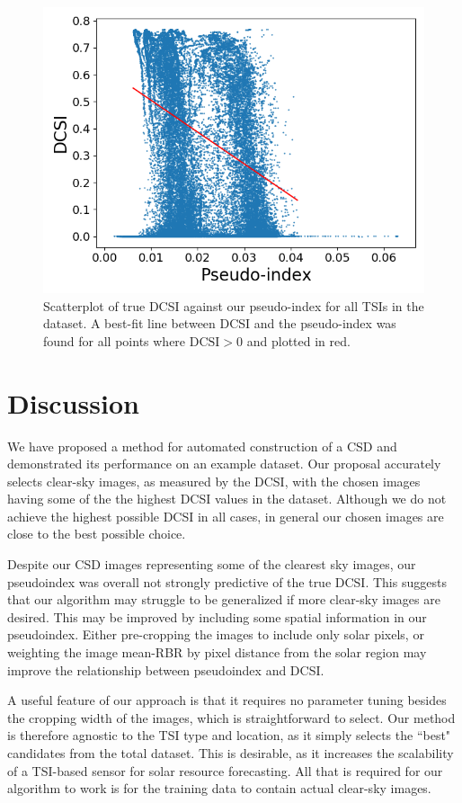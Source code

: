 \documentclass{article}
\begin{document}
\begin{figure}[h]
    \centering
    \includegraphics[scale=.7]{Figures/cspi_dcsi_scatter.png}
    \caption{Scatterplot of true DCSI against our pseudo-index for all TSIs in the dataset. A best-fit line between DCSI and the pseudo-index was found for all points where $\text{DCSI}>0$ and plotted in red. }
    \label{fig:cpsi_dcsi}
\end{figure}


\section{Discussion}
We have proposed a method for automated construction of a CSD and demonstrated its performance on an example dataset. Our proposal accurately selects clear-sky images, as measured by the DCSI, with the chosen images having some of the the highest DCSI values in the dataset. Although we do not achieve the highest possible DCSI in all cases, in general our chosen images are close to the best possible choice.   

Despite our CSD images representing some of the clearest sky images, our pseudoindex was overall not strongly predictive of the true DCSI. This suggests that our algorithm may struggle to be generalized if more clear-sky images are desired. This may be improved by including some spatial information in our pseudoindex. Either pre-cropping the images to include only solar pixels, or weighting the image mean-RBR by pixel distance from the solar region may improve the relationship between pseudoindex and DCSI. 

A useful feature of our approach is that it requires no parameter tuning besides the cropping width of the images, which is straightforward to select. Our method is therefore agnostic to the TSI type and location, as it simply selects the ``best" candidates from the total dataset. This is desirable, as it increases the scalability of a TSI-based sensor for solar resource forecasting. All that is required for our algorithm to work is for the training data to contain actual clear-sky images.

\newpage
\printbibliography
\end{document}
